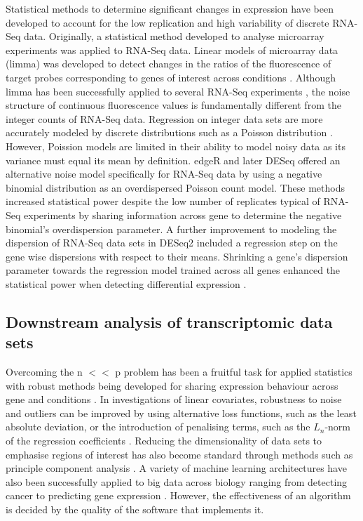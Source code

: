 \documentclass[../main.tex]{subfiles}
\begin{document}
Statistical methods to determine significant changes in expression have been developed to account for the low replication and high variability of discrete RNA-Seq data.
Originally, a statistical method developed to analyse microarray experiments was applied to RNA-Seq data.
Linear models of microarray data (limma) was developed to detect changes in the ratios of the fluorescence of target probes corresponding to genes of interest across conditions \parencite{Smyth2005}.
Although limma has been successfully applied to several RNA-Seq experiments \parencite{Ritchie2015}, the noise structure of continuous fluorescence values is fundamentally different from the integer counts of RNA-Seq data.
Regression on integer data sets are more accurately modeled by discrete distributions such as a Poisson distribution \parencite{Cameron1998}.
However, Poission models are limited in their ability to model noisy data as its variance must equal its mean by definition.
edgeR \parencite{Robinson2010} and later DESeq \parencite{Anders2010} offered an alternative noise model specifically for RNA-Seq data by using a negative binomial distribution as an overdispersed Poisson count model.
These methods increased statistical power despite the low number of replicates typical of RNA-Seq experiments by sharing information across gene to determine the negative binomial's overdispersion parameter.
A further improvement to modeling the dispersion of RNA-Seq data sets in DESeq2 included a regression step on the gene wise dispersions with respect to their means. 
Shrinking a gene's dispersion parameter towards the regression model trained across all genes enhanced the statistical power when detecting differential expression \parencite{Love2014}.


\subsection{Downstream analysis of transcriptomic data sets}

Overcoming the n $<<$ p problem has been a fruitful task for applied statistics with robust methods being developed for sharing expression behaviour across gene and conditions \parencite{Gui2005}.
In investigations of linear covariates, robustness to noise and outliers can be improved by using alternative loss functions, such as the least absolute deviation, or the introduction of penalising terms, such as the $L_n$-norm of the regression coefficients \parencite{Wu2015}.
Reducing the dimensionality of data sets to emphasise regions of interest has also become standard through methods such as principle component analysis \parencite{Wall2005}.  
A variety of machine learning architectures have also been successfully applied to big data across biology ranging from detecting cancer to predicting gene expression \parencite{Xie2017, Liang2015, Tang2019}.
However, the effectiveness of an algorithm is decided by the quality of the software that implements it. 
\end{document}
